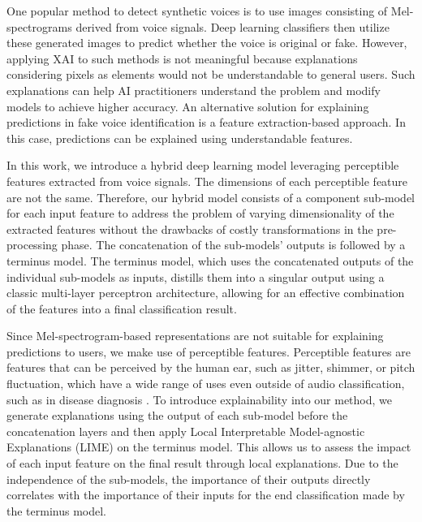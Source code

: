 \documentclass{article}
\begin{document}
One popular method to detect synthetic voices is to use images consisting of Mel-spectrograms derived from voice signals. Deep learning classifiers then utilize these generated images to predict whether the voice is original or fake. However, applying XAI to such methods is not meaningful because explanations considering pixels as elements would not be understandable to general users. Such explanations can help AI practitioners understand the problem and modify models to achieve higher accuracy. An alternative solution for explaining predictions in fake voice identification is a feature extraction-based approach. In this case, predictions can be explained using understandable features.

In this work, we introduce a hybrid deep learning model leveraging perceptible features extracted from voice signals. The dimensions of each perceptible feature are not the same. Therefore, our hybrid model consists of a component sub-model for each input feature to address the problem of varying dimensionality of the extracted features without the drawbacks of costly transformations in the pre-processing phase. The concatenation of the sub-models' outputs is followed by a terminus model. The terminus model, which uses the concatenated outputs of the individual sub-models as inputs, distills them into a singular output using a classic multi-layer perceptron architecture, allowing for an effective combination of the features into a final classification result.

Since Mel-spectrogram-based representations are not suitable for explaining predictions to users, we make use of perceptible features. Perceptible features are features that can be perceived by the human ear, such as jitter, shimmer, or pitch fluctuation, which have a wide range of uses even outside of audio classification, such as in disease diagnosis \cite{chaiwongyen_deepfake-speech_2023}. To introduce explainability into our method, we generate explanations using the output of each sub-model before the concatenation layers and then apply Local Interpretable Model-agnostic Explanations (LIME) \cite{ribeiro_why_2016} on the terminus model. This allows us to assess the impact of each input feature on the final result through local explanations. Due to the independence of the sub-models, the importance of their outputs directly correlates with the importance of their inputs for the end classification made by the terminus model.
\end{document}

